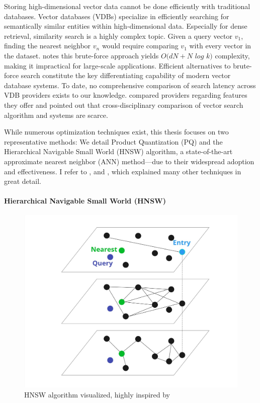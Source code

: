 Storing high-dimensional vector data cannot be done efficiently with traditional databases. Vector databases (VDBs) specialize in efficiently searching for semantically similar entities within high-dimensional data. Especially for dense retrieval, similarity search is a highly complex topic. Given a query vector $v_1$, finding the nearest neighbor $v_{n}$ would require comparing $v_1$ with every vector in the dataset. \citet{Jing.2024} notes this brute-force approach yields $O(dN+N$ $log$ $k)$ complexity, making it impractical for large-scale applications. Efficient alternatives to brute-force search constitute the key differentiating capability of modern vector database systems. To date, no comprehensive comparison of search latency across VDB providers exists to our knowledge. \citet{Pan.2024} compared providers regarding features they offer and pointed out that cross-disciplinary comparison of vector search algorithm and systems are scarce.

While numerous optimization techniques exist, this thesis focuses on two representative methods: We detail Product Quantization (PQ) and the Hierarchical Navigable Small World (HNSW) algorithm, a state-of-the-art approximate nearest neighbor (ANN) method—due to their widespread adoption and effectiveness. I refer to \citet{Jing.2024}, and \citet{Kukreja.2023}, which explained many other techniques in great detail.

\paragraph{Hierarchical Navigable Small World (HNSW)}

\begin{figure}[h!]
    \centering
    \includegraphics[width=\textwidth]{images/HNSW.jpg}
    \caption{HNSW algorithm visualized, highly inspired by \citet{Pinecone.22.01.2025}}
    \label{fig:HNSW}
\end{figure}

